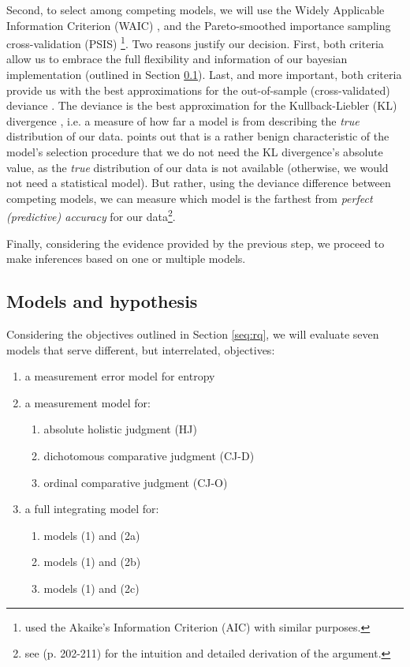Second, to select among competing models, we will use the Widely Applicable Information Criterion (WAIC) \citep{Watanabe_2013}, and the Pareto-smoothed importance sampling cross-validation (PSIS) \citep{Vehtari_et_al_2021}\footnote{\citet{vanDaal_2020} used the Akaike’s Information Criterion (AIC) \citep{Akaike_1974} with similar purposes.}. Two reasons justify our decision. First, both criteria allow us to embrace the full flexibility and information of our bayesian implementation (outlined in Section \ref{s_sect:models}). Last, and more important, both criteria provide us with the best approximations for the out-of-sample (cross-validated) deviance \citep{McElreath_2020}. The deviance is the best approximation for the Kullback-Liebler (KL) divergence \citep{Kullback_et_al_1951}, i.e. a measure of how far a model is from describing the \textit{true} distribution of our data. \citet{McElreath_2020} points out that is a rather benign characteristic of the model's selection procedure that we do not need the KL divergence's absolute value, as the \textit{true} distribution of our data is not available (otherwise, we would not need a statistical model). But rather, using the deviance difference between competing models, we can measure which model is the farthest from \textit{perfect (predictive) accuracy} for our data\footnote{see \citet{McElreath_2020} (p. 202-211) for the intuition and detailed derivation of the argument.}.

Finally, considering the evidence provided by the previous step, we proceed to make inferences based on one or multiple models.
%
%
\subsection{Models and hypothesis} \label{s_sect:models}
%
Considering the objectives outlined in Section \ref{seq:rq}, we will evaluate seven models that serve different, but interrelated, objectives:
%
\begin{enumerate} \itemsep1pt
	\item[(1)] a measurement error model for entropy
	\item[(2)] a measurement model for: 
	\begin{enumerate} \itemsep1pt
		\item absolute holistic judgment (HJ)
		\item dichotomous comparative judgment (CJ-D)
		\item ordinal comparative judgment (CJ-O)
	\end{enumerate}
	\item[(3)] a full integrating model for: 
	\begin{enumerate} \itemsep1pt
		\item models (1) and (2a)
		\item models (1) and (2b)
		\item models (1) and (2c)
	\end{enumerate}
\end{enumerate} 
%
%
